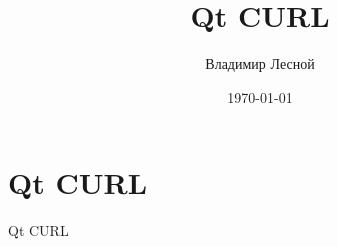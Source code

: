 \documentclass[a4paper,notitlepage,UTF8]{ctexart}
\title{Qt CURL}
\author{Владимир Лесной}
\date{\today}
\begin{document}
  \maketitle


\section{Qt CURL}

Qt CURL
\end{document}
